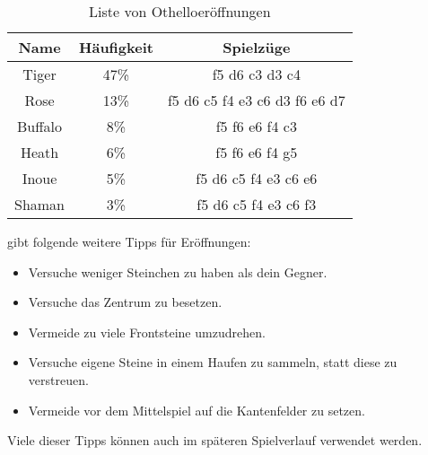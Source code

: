 \begin{table}[h]
  \centering
  \begin{tabular}{| c | c | c |}
    \hline
     Name & Häufigkeit & Spielzüge \\ \hline
     Tiger  &   47\%   & f5 d6 c3 d3 c4 \\ \hline
     Rose &   13\%   & f5 d6 c5 f4 e3 c6 d3 f6 e6 d7 \\ \hline
     Buffalo &  8\%    & f5 f6 e6 f4 c3 \\ \hline
     Heath  &  6\%    &  f5 f6 e6 f4 g5 \\ \hline
     Inoue &   5\%   &  f5 d6 c5 f4 e3 c6 e6\\ \hline
     Shaman &   3\%   & f5 d6 c5 f4 e3 c6 f3 \\ \hline
  \end{tabular}
  \caption{Liste von Othelloeröffnungen \cite{Ortiz.}}
  \label{tab:eroeffnungen}
\end{table}
\cite{Ortiz.} gibt folgende weitere Tipps für Eröffnungen:
\begin{itemize}
\item Versuche weniger Steinchen zu haben als dein Gegner.
\item Versuche das Zentrum zu besetzen.
\item Vermeide zu viele Frontsteine umzudrehen.
\item Versuche eigene Steine in einem Haufen zu sammeln, statt diese zu verstreuen.
\item Vermeide vor dem Mittelspiel auf die Kantenfelder zu setzen.
\end{itemize}
Viele dieser Tipps können auch im späteren Spielverlauf verwendet werden.
